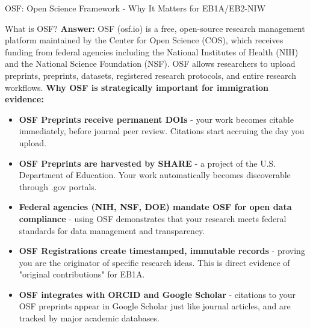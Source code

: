 \documentclass[11pt]{beamer}
\begin{document}
	\begin{frame}{OSF: Open Science Framework - Why It Matters for EB1A/EB2-NIW}
		\scriptsize
		\begin{block}{What is OSF?}
			\textbf{Answer:} OSF (osf.io) is a free, open-source research management platform maintained by the Center for Open Science (COS), which receives funding from federal agencies including the National Institutes of Health (NIH) and the National Science Foundation (NSF). OSF allows researchers to upload preprints, preprints, datasets, registered research protocols, and entire research workflows.
			\vspace{0.1cm}
			\textbf{Why OSF is strategically important for immigration evidence:}
			\begin{itemize}
				\item \textbf{OSF Preprints receive permanent DOIs} - your work becomes citable immediately, before journal peer review. Citations start accruing the day you upload.
				\item \textbf{OSF Preprints are harvested by SHARE} - a project of the U.S. Department of Education. Your work automatically becomes discoverable through .gov portals.
				\item \textbf{Federal agencies (NIH, NSF, DOE) mandate OSF for open data compliance} - using OSF demonstrates that your research meets federal standards for data management and transparency.
				\item \textbf{OSF Registrations create timestamped, immutable records} - proving you are the originator of specific research ideas. This is direct evidence of "original contributions" for EB1A.
				\item \textbf{OSF integrates with ORCID and Google Scholar} - citations to your OSF preprints appear in Google Scholar just like journal articles, and are tracked by major academic databases.
			\end{itemize}
		\end{block}
	\end{frame}
	
\end{document}
